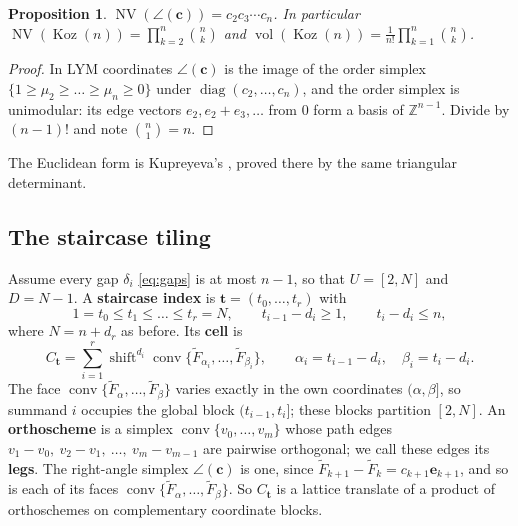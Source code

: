 \documentclass[11pt, a4paper, abstract=yes]{scrartcl}
\theoremstyle{definition}
\theoremstyle{remark}
\theoremstyle{plain}
\newtheorem{proposition}[definition]{Proposition}
\newcommand{\vek}[1]{\boldsymbol{#1}}
\theoremstyle{remark}
\theoremstyle{plain}
\newcommand{\Koz}{\operatorname{Koz}}
\newcommand{\shift}{\operatorname{shift}}
\newcommand{\conv}{\operatorname{conv}}
\newcommand{\rasimp}{\angle}
\newcommand{\NV}{\operatorname{NV}}
\newcommand{\vol}{\operatorname{vol}}
\newcommand{\leanpartial}{\tikz[baseline=-0.6ex]{\fill[leanfull] (0,-0.6ex) arc (-90:90:0.6ex) -- cycle;\draw[leanfull,line width=0.5pt] (0,0) circle (0.6ex);}}
\newcommand{\leanmark}[1]{\leavevmode{\reversemarginpar\marginnote{\raggedleft#1}}}
\let\autocite\cite
\begin{document}
\begin{proposition}
\leanmark{\leanpartial}\(\NV(\rasimp(\vek c))=c_2c_3\cdots c_n\). In particular \(\NV(\Koz(n))=\prod_{k=2}^n\binom nk\) and
\(\vol(\Koz(n))=\frac1{n!}\prod_{k=1}^n\binom nk\).
\label{prop-simplex-volume}
\end{proposition}

\begin{proof}
In LYM coordinates \(\rasimp(\vek c)\) is the image of the order simplex
\(\lbrace1\ge\mu_2\ge\dots\ge\mu_n\ge0\rbrace\) under \(\operatorname{diag}(c_2,\dots,c_n)\), and the order
simplex is unimodular: its edge vectors \(e_2,e_2+e_3,\dots\) from \(0\) form a basis of
\(\mathbb Z^{n-1}\). Divide by \((n-1)!\) and note \(\binom n1=n\).
\end{proof}

The Euclidean form is Kupreyeva's \autocite[Section 6.1]{Kupreyeva2019}, proved there by the same
triangular determinant.
\subsection{The staircase tiling}
\label{sec:org940a807}

Assume every gap \(\delta_i\) \eqref{eq:gaps} is at most \(n-1\), so that \(U=[2,N]\) and \(D=N-1\). A
\textbf{staircase index} is \(\vek t=(t_0,\dots,t_r)\) with
\begin{equation}\label{eq:staircase-index}
  1=t_0\le t_1\le\dots\le t_r=N,\qquad t_{i-1}-d_i\ge1,\qquad t_i-d_i\le n ,
\end{equation}
where \(N=n+d_r\) as before. Its \textbf{cell} is
\begin{equation}\label{eq:cell}
  C_{\vek t}=\sum_{i=1}^r\shift^{d_i}\conv\lbrace\tilde F_{\alpha_i},\dots,\tilde F_{\beta_i}\rbrace,
  \qquad \alpha_i=t_{i-1}-d_i,\quad \beta_i=t_i-d_i .
\end{equation}
The face
\(\conv\lbrace\tilde F_\alpha,\dots,\tilde F_\beta\rbrace\) varies exactly in the own coordinates
\((\alpha,\beta]\), so summand \(i\) occupies the global block \((t_{i-1},t_i]\); these blocks partition
\([2,N]\). An \textbf{orthoscheme} is a simplex \(\conv\lbrace v_0,\dots,v_m\rbrace\) whose path edges
\(v_1-v_0,\ v_2-v_1,\ \dots,\ v_m-v_{m-1}\) are pairwise orthogonal; we call these edges its
\textbf{legs}. The
right-angle simplex \(\rasimp(\vek c)\) is one, since \(\tilde F_{k+1}-\tilde F_k=c_{k+1}\vek e_{k+1}\),
and so is each of its faces \(\conv\lbrace\tilde F_\alpha,\dots,\tilde F_\beta\rbrace\). So
\(C_{\vek t}\) is a lattice translate of a product of orthoschemes on complementary coordinate blocks.
\end{document}
